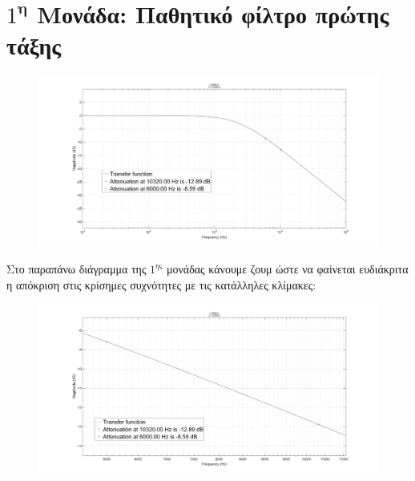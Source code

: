 \documentclass{article}
\begin{document}
{\newpage
\section*{$1^\textbf{η}$ Μονάδα: Παθητικό φίλτρο πρώτης τάξης} 
  \begin{figure}[h!]
\centering
 	\advance\leftskip-4cm
  \includegraphics[width=200mm,scale=2]{t1.jpg}
\end{figure}
\normalsize{}
Στο παραπάνω διάγραμμα της $1^{ης}$ μονάδας κάνουμε ζουμ ώστε να φαίνεται ευδιάκριτα η απόκριση στις κρίσημες συχνότητες με τις κατάλληλες κλίμακες:
\large{}
 \begin{figure}[h!]
\centering
 	\advance\leftskip-1cm
  \includegraphics[width=120mm,scale=2]{z1.jpg}
\end{figure}
\newpage
}
\end{document}
